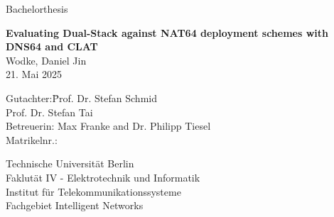 \documentclass[a4paper, 12pt]{report}
\begin{document}
\begin{titlepage}
\begin{centering}
			\vspace{7mm}
			
			\LARGE
			
			Bachelorthesis
			
			\textbf{ Evaluating Dual-Stack against NAT64 deployment schemes with DNS64 and CLAT}\\[2.5cm]
			
			
			\large
			Wodke, Daniel Jin\\
			21. Mai 2025\\[3.2cm]
			
			\begin{minipage}{\linewidth} 
				\begin{tabbing}
					Gutachter:\quad \=Prof. Dr. Stefan Schmid\\
					\> Prof. Dr. Stefan Tai\\
					Betreuerin:       \> Max Franke and Dr. Philipp Tiesel\\
					Matrikelnr.: \\
				\end{tabbing}
			\end{minipage}
			
			\vfill
			
			\normalsize
			{Technische Universität Berlin}\\
			{Faklutät IV - Elektrotechnik und Informatik}\\
			{Institut für Telekommunikationssysteme}\\
			{Fachgebiet Intelligent Networks}\\
		\end{centering}
	\end{titlepage}
	
	\newpage
	
	\newpage
	
	\newpage
	
	\tableofcontents
	\newpage
	\clearpage
	\printglossaries

	\newpage

	
	
	
	

	
	
	
	
	
	

	
	
	
\end{document}
